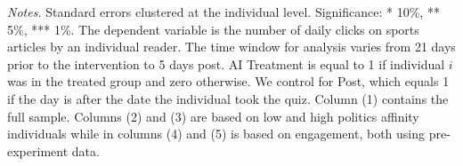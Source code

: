  \begin{table}[H]
 \centering
 \caption{Post-Intervention Content Engagement: Sports articles (daily)}
 \label{tab:content_did_panelb}
 {}
 \par
 \begin{minipage}{0.98\linewidth}
 \baselineskip9pt {\scriptsize \vspace{0.1cm} { \it Notes.} Standard errors clustered at the individual level. Significance: * 10\%, ** 5\%, *** 1\%. The dependent variable is the number of daily clicks on sports articles by an individual reader. The time window for analysis varies from 21 days prior to the intervention to 5 days post. AI Treatment is equal to 1 if individual $i$ was in the treated group and zero otherwise. We control for Post, which equals 1 if the day is after the date the individual took the quiz. Column (1) contains the full sample. Columns (2) and (3) are based on low and high politics affinity individuals while in columns (4) and (5) is based on engagement, both using pre-experiment data.}
 \end{minipage}
 \end{table}
